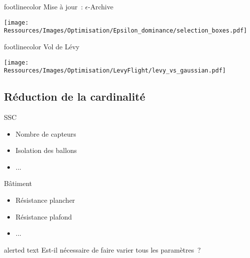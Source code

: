 \documentclass[xcolor=x11names, compress, 11pt]{beamer}
\newcommand{\addsubtitle}[1]{%
\begin{beamercolorbox}[sep=2pt,center,shadow=true,rounded=true]{footlinecolor}
    #1\par%
\end{beamercolorbox}%
}
\newcommand{\addalert}[1]{%
\begin{beamercolorbox}[sep=2pt,center,shadow=true,rounded=true]{alerted text}
    #1\par%
\end{beamercolorbox}%
}
\begin{document}
\begin{frame}[t]
    \addsubtitle{Mise à jour~: $\epsilon$-Archive}
    \vfill
    \centering
    \texttt{[image: Ressources/Images/Optimisation/Epsilon\_dominance/selection\_boxes.pdf]}
    \vfill
\end{frame}


\begin{frame}[t]
    \addsubtitle{Vol de Lévy}
    \vfill
    \centering
    \texttt{[image: Ressources/Images/Optimisation/LevyFlight/levy\_vs\_gaussian.pdf]}
    \vfill
\end{frame}


\subsection{Réduction de la cardinalité}
\begin{frame}[t]
    \centering
    SSC
    \begin{itemize}
        \item Nombre de capteurs
        \item Isolation des ballons
        \item ...
    \end{itemize}
    \vfill
    Bâtiment
    \begin{itemize}
        \item Résistance plancher
        \item Résistance plafond
        \item ...
    \end{itemize}
    \vfill
    \addalert{Est-il nécessaire de faire varier tous les paramètres~?}
\end{frame}
\end{document}

